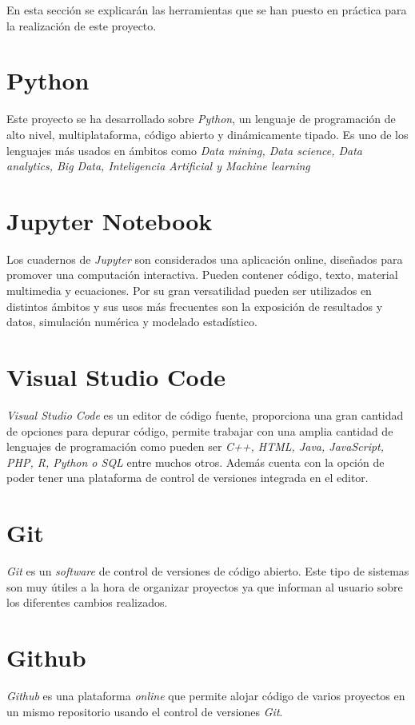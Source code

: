  \label{cap:tecHerra}
En esta sección se explicarán las herramientas que se han puesto en práctica para la realización de este proyecto. 

\section{Python}
Este proyecto se ha desarrollado sobre \textit{Python}, un lenguaje de programación de alto nivel, multiplataforma, código abierto y dinámicamente tipado. Es uno de los lenguajes más usados en ámbitos como \textit{Data mining, Data science, Data analytics, Big Data, Inteligencia Artificial y Machine learning}

\section{Jupyter Notebook}
Los cuadernos de \textit{Jupyter} son considerados una aplicación online, diseñados para promover una computación interactiva. Pueden contener código, texto, material multimedia y ecuaciones. Por su gran versatilidad pueden ser utilizados en distintos ámbitos y sus usos más frecuentes son la exposición de resultados y datos, simulación numérica y modelado estadístico.

\section{Visual Studio Code}
\textit{Visual Studio Code} es un editor de código fuente, proporciona una gran cantidad de opciones para depurar código, permite trabajar con una amplia cantidad de lenguajes de programación como pueden ser \textit{C++, HTML, Java, JavaScript, PHP, R, Python o SQL} entre muchos otros. 
Además cuenta con la opción de poder tener una plataforma de control de versiones integrada en el editor.

\section{Git}
\textit{Git} es un \textit{software} de control de versiones de código abierto. Este tipo de sistemas son muy útiles a la hora de organizar proyectos ya que informan al usuario sobre los diferentes cambios realizados.

\section{Github}
\textit{Github} es una plataforma \textit{online} que permite alojar código de varios proyectos en un mismo repositorio usando el control de versiones \textit{Git}.


